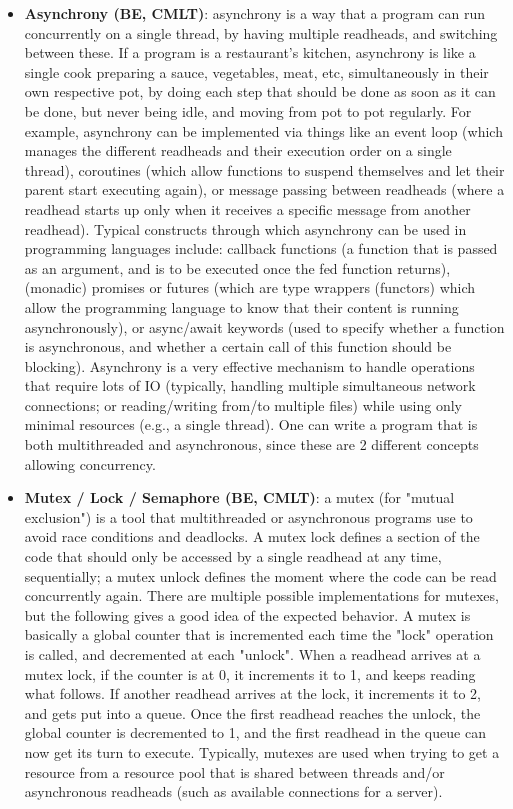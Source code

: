 \documentclass{article}
\begin{document}
\begin{itemize}
	\item \textbf{Asynchrony (BE, CMLT)}: asynchrony is a way that a program can run concurrently on a single thread, by having multiple readheads, and switching between these. If a program is a restaurant's kitchen, asynchrony is like a single cook preparing a sauce, vegetables, meat, etc, simultaneously in their own respective pot, by doing each step that should be done as soon as it can be done, but never being idle, and moving from pot to pot regularly. For example, asynchrony can be implemented via things like an event loop (which manages the different readheads and their execution order on a single thread), coroutines (which allow functions to suspend themselves and let their parent start executing again), or message passing between readheads (where a readhead starts up only when it receives a specific message from another readhead). Typical constructs through which asynchrony can be used in programming languages include: callback functions (a function that is passed as an argument, and is to be executed once the fed function returns), (monadic) promises or futures (which are type wrappers (functors) which allow the programming language to know that their content is running asynchronously), or async/await keywords (used to specify whether a function is asynchronous, and whether a certain call of this function should be blocking). Asynchrony is a very effective mechanism to handle operations that require lots of IO (typically, handling multiple simultaneous network connections; or reading/writing from/to multiple files) while using only minimal resources (e.g., a single thread). One can write a program that is both multithreaded and asynchronous, since these are 2 different concepts allowing concurrency.

	\item \textbf{Mutex / Lock / Semaphore (BE, CMLT)}: a mutex (for "mutual exclusion") is a tool that multithreaded or asynchronous programs use to avoid race conditions and deadlocks. A mutex lock defines a section of the code that should only be accessed by a single readhead at any time, sequentially; a mutex unlock defines the moment where the code can be read concurrently again. There are multiple possible implementations for mutexes, but the following gives a good idea of the expected behavior. A mutex is basically a global counter that is incremented each time the "lock" operation is called, and decremented at each "unlock". When a readhead arrives at a mutex lock, if the counter is at 0, it increments it to 1, and keeps reading what follows. If another readhead arrives at the lock, it increments it to 2, and gets put into a queue. Once the first readhead reaches the unlock, the global counter is decremented to 1, and the first readhead in the queue can now get its turn to execute. Typically, mutexes are used when trying to get a resource from a resource pool that is shared between threads and/or asynchronous readheads (such as available connections for a server).


\end{itemize}
\end{document}
